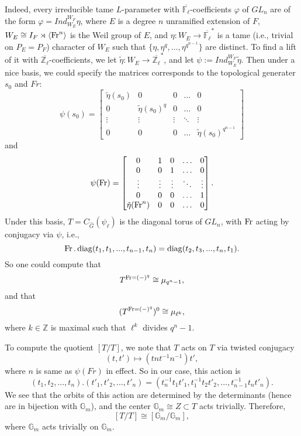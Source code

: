 Indeed, every irreducible tame $L$-parameter with $\overline{\mathbb{F}_{\ell}}$-coefficients $\varphi$ of $GL_n$ are of the form $\varphi=Ind_{W_E}^{W_F}\eta$, where $E$ is a degree $n$ unramified extension of $F$, $W_E \cong I_F \rtimes \left<\operatorname{Fr}^n\right>$ is the Weil group of $E$, and $\eta: W_E \to \overline{\mathbb{F}_{\ell}}^*$ is a tame (i.e., trivial on $P_E=P_F$) character of $W_E$ such that $\{\eta, \eta^q, ..., \eta^{q^{n-1}}\}$ are distinct. To find a lift of it with $\overline{\mathbb{Z}_{\ell}}$-coefficients, we let $\tilde{\eta}: W_E \to \overline{\mathbb{Z}_{\ell}}^*$, and let $\psi:=Ind_{W_E}^{W_F}\tilde{\eta}$. Then under a nice basis, we could specify the matrices corresponds to the topological generater $s_0$ and $Fr$:
$$\psi(s_0)=
\begin{bmatrix}
	\tilde{\eta}(s_0) & 0                   & 0      & \dots  & 0 \\
	0                 & \tilde{\eta}(s_0)^q & 0      & \dots  & 0 \\
	\vdots            & \vdots              & \vdots & \ddots & \vdots \\
	0                 & 0                   & 0      & \dots   & \tilde{\eta}(s_0)^{q^{n-1}}
\end{bmatrix}$$
and 
$$\psi(\operatorname{Fr})=
\begin{bmatrix}
	0                   & 1      & 0      & \dots  & 0 \\
	0                   & 0      & 1      & \dots  & 0 \\
	\vdots              & \vdots & \vdots & \ddots & \vdots \\
	0                   & 0      & 0      & \dots  & 1 \\
	\tilde{\eta}(\operatorname{Fr}^n) & 0      & 0      & \dots  & 0
\end{bmatrix}
.$$
Under this basis, $T=C_{\hat{G}}(\psi_{\ell})$ is the diagonal torus of $GL_n$, with $\operatorname{Fr}$ acting by conjugacy via $\psi$, i.e., 
$$\operatorname{Fr}. \operatorname{\operatorname{diag}}(t_1, t_1, ..., t_{n-1}, t_{n}) = \operatorname{\operatorname{diag}}(t_{2}, t_{3}, ..., t_{n}, t_{1}).$$
So one could compute that 
$$T^{\operatorname{Fr}=(-)^q}\cong \mu_{q^n-1},$$
and that
$$(T^{\operatorname{Fr}=(-)^q})^0 \cong \mu_{\ell^k},$$
where $k \in \mathbb{Z}$ is maximal such that $\ell^k$ divides $q^n-1$.

To compute the quotient $[T/T]$, we note that $T$ acts on $T$ via twisted conjugacy
$$(t, t') \mapsto (tnt^{-1}n^{-1})t',$$
where $n$ is same as $\psi(Fr)$ in effect. So in our case, this action is 
$$(t_1, t_2, ..., t_n).(t'_1, t'_2, ..., t'_n)=(t_n^{-1}t_1t'_1, t_1^{-1}t_2t'_2, ..., t_{n-1}^{-1}t_nt'_n).$$ 
We see that the orbits of this action are determined by the determinants (hence are in bijection with $\mathbb{G}_m$), and the center $\mathbb{G}_m \cong Z \subset T$ acts trivially. Therefore,
$$[T/T] \cong [\mathbb{G}_m/\mathbb{G}_m],$$
where $\mathbb{G}_m$ acts trivially on $\mathbb{G}_m$.

